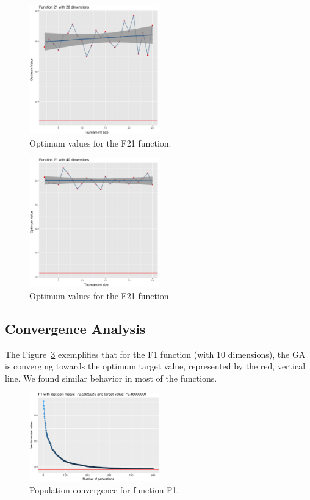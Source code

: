\begin{figure}[!ht]
	\includegraphics[width=0.5\textwidth]{img/21dim_20.ps}
	\caption{Optimum values for the F21 function.}
	\label{21dim_20}
\end{figure}

\begin{figure}[!ht]
	\includegraphics[width=0.5\textwidth]{img/21dim_40.ps}
	\caption{Optimum values for the F21 function.}
	\label{21dim_40}
\end{figure}

\subsection{Convergence Analysis}
The Figure~\ref{convegenceF1} exemplifies that for the F1 function (with 10 dimensions), the GA is converging towards the optimum target value, represented by the red, vertical line. We found similar behavior in most of the functions.

\begin{figure}[!ht]
	\includegraphics[width=0.5\textwidth]{img/unnamed-chunk-1-1}
	\caption{Population convergence for function F1.}
	\label{convegenceF1}
\end{figure}


